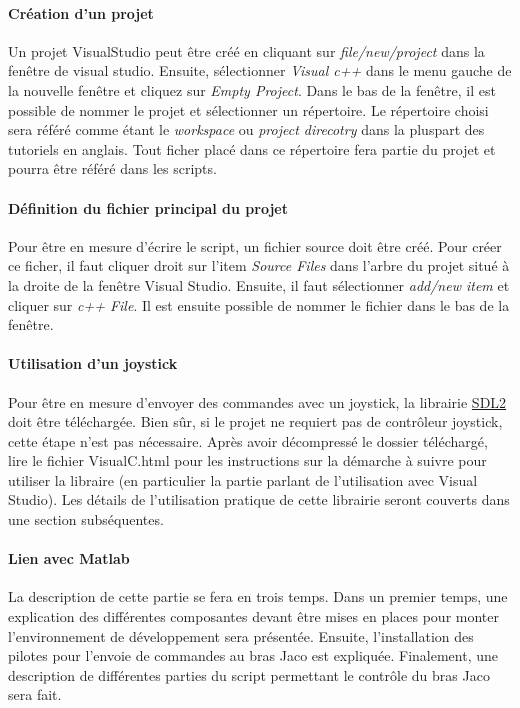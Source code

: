 \paragraph{Création d'un projet}
Un projet VisualStudio peut être créé en cliquant sur \textit{file/new/project} dans la fenêtre de visual studio.
Ensuite, sélectionner \textit{Visual c++} dans le menu gauche de la nouvelle fenêtre et cliquez sur \textit{Empty Project}.
Dans le bas de la fenêtre, il est possible de nommer le projet et sélectionner un répertoire.
Le répertoire choisi sera référé comme étant le \textit{workspace} ou \textit{project direcotry} dans la pluspart des tutoriels en anglais.
Tout ficher placé dans ce répertoire fera partie du projet et pourra être référé dans les scripts.

\paragraph{Définition du fichier principal du projet}
Pour être en mesure d'écrire le script, un fichier source doit être créé.
Pour créer ce ficher, il faut cliquer droit sur l'item \textit{Source Files} dans l'arbre du projet situé à la droite de la fenêtre Visual Studio.
Ensuite, il faut sélectionner \textit{add/new item} et cliquer sur \textit{c++ File}.
Il est ensuite possible de nommer le fichier dans le bas de la fenêtre.

\paragraph{Utilisation d'un joystick}
Pour être en mesure d'envoyer des commandes avec un joystick, la librairie \href{https://www.libsdl.org/release/SDL2-2.0.7.zip
}{SDL2} doit être téléchargée.
Bien sûr, si le projet ne requiert pas de contrôleur joystick, cette étape n'est pas nécessaire.
Après avoir décompressé le dossier téléchargé, lire le fichier VisualC.html pour les instructions sur la démarche à suivre pour utiliser la libraire (en particulier la partie parlant de l'utilisation avec Visual Studio).
Les détails de l'utilisation pratique de cette librairie seront couverts dans une section subséquentes.

\paragraph{Lien avec Matlab}

La description de cette partie se fera en trois temps.
Dans un premier temps, une explication des différentes composantes devant être mises en places pour monter l'environnement de développement sera présentée.
Ensuite, l'installation des pilotes pour l'envoie de commandes au bras Jaco est expliquée.
Finalement, une description de différentes parties du script permettant le contrôle du bras Jaco sera fait.


